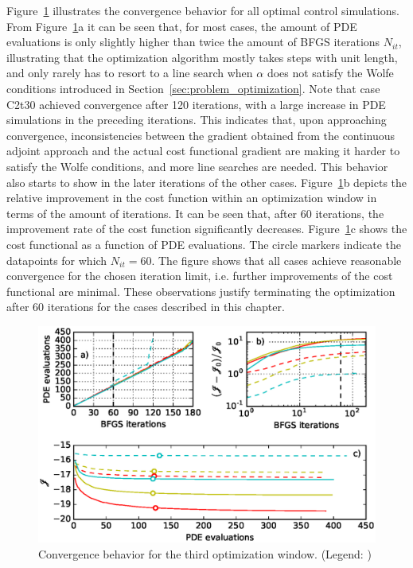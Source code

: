 Figure~\ref{fig:window_opt} illustrates the convergence behavior for all optimal control simulations. From Figure~\ref{fig:window_opt}a it can be seen that, for most cases, the amount of PDE evaluations is only slightly higher than twice the amount of BFGS iterations $N_{it}$, illustrating that the optimization algorithm mostly takes steps with unit length, and only rarely has to resort to a line search when $\alpha$ does not satisfy the Wolfe conditions introduced in Section~\ref{sec:problem_optimization}. Note that case C2t30 achieved convergence after 120 iterations, with a large increase in PDE simulations in the preceding iterations. This indicates that, upon approaching convergence, inconsistencies between the gradient obtained from the continuous adjoint approach and the actual cost functional gradient are making it harder to satisfy the Wolfe conditions, and more line searches are needed. This behavior also starts to show in the later iterations of the other cases. Figure~\ref{fig:window_opt}b depicts the relative improvement in the cost function within an optimization window in terms of the amount of iterations. It can be seen that, after 60 iterations, the improvement rate of the cost function significantly decreases. Figure~\ref{fig:window_opt}c shows the cost functional as a function of PDE evaluations. The circle markers indicate the datapoints for which $N_{it} = 60$. The figure shows that all cases achieve reasonable convergence for the chosen iteration limit, i.e. further improvements of the cost functional are minimal. These observations justify terminating the optimization after 60 iterations for the cases described in this chapter. 

\begin{figure}
	\centering
	\includegraphics[width=0.9\linewidth]{chapters/philtrans_torque/figure11.eps}
	\caption[Convergence behavior for the third optimization window.]{Convergence behavior for the third optimization window. (Legend: \legendnoref) \label{fig:window_opt}}
\end{figure}
	
